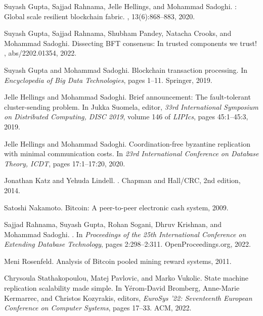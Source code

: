 \documentclass[11pt]{article}
\begin{document}
\begin{thebibliography}{10}
Suyash Gupta, Sajjad Rahnama, Jelle Hellings, and Mohammad Sadoghi.
: Global scale resilient blockchain fabric.
, 13(6):868--883, 2020.

Suyash Gupta, Sajjad Rahnama, Shubham Pandey, Natacha Crooks, and Mohammad
  Sadoghi.
\newblock Dissecting {BFT} consensus: In trusted components we trust!
, abs/2202.01354, 2022.

Suyash Gupta and Mohammad Sadoghi.
\newblock Blockchain transaction processing.
\newblock In {\em Encyclopedia of Big Data Technologies}, pages 1--11.
  Springer, 2019.

Jelle Hellings and Mohammad Sadoghi.
\newblock Brief announcement: The fault-tolerant cluster-sending problem.
\newblock In Jukka Suomela, editor, {\em 33rd International Symposium on
  Distributed Computing, {DISC} 2019}, volume 146 of {\em LIPIcs}, pages
  45:1--45:3, 2019.

Jelle Hellings and Mohammad Sadoghi.
\newblock Coordination-free byzantine replication with minimal communication
  costs.
\newblock In {\em 23rd International Conference on Database Theory, {ICDT}},
  pages 17:1--17:20, 2020.

Jonathan Katz and Yehuda Lindell.
.
\newblock Chapman and Hall/CRC, 2nd edition, 2014.

Satoshi Nakamoto.
\newblock Bitcoin: A peer-to-peer electronic cash system, 2009.

Sajjad Rahnama, Suyash Gupta, Rohan Sogani, Dhruv Krishnan, and Mohammad
  Sadoghi.
.
\newblock In {\em Proceedings of the 25th International Conference on Extending
  Database Technology}, pages 2:298--2:311. OpenProceedings.org, 2022.

Meni Rosenfeld.
\newblock Analysis of {Bitcoin} pooled mining reward systems, 2011.

Chrysoula Stathakopoulou, Matej Pavlovic, and Marko Vukolic.
\newblock State machine replication scalability made simple.
\newblock In Y{\'{e}}rom{-}David Bromberg, Anne{-}Marie Kermarrec, and Christos
  Kozyrakis, editors, {\em EuroSys '22: Seventeenth European Conference on
  Computer Systems}, pages 17--33. {ACM}, 2022.


\end{thebibliography}
\end{document}
